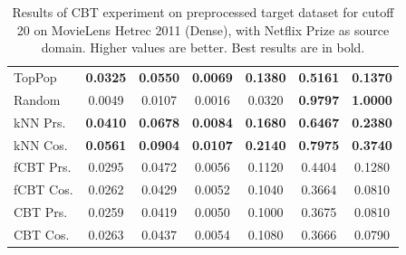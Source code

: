 \begin{table}[hbt]
\begin{tabulary}{\textwidth}{|L|CCCCCC|}
\hline
TopPop & \textbf{0.0325} & \textbf{0.0550} & \textbf{0.0069} & \textbf{0.1380} & \textbf{0.5161} & \textbf{0.1370} \\
Random & 0.0049 & 0.0107 & 0.0016 & 0.0320 & \textbf{0.9797} & \textbf{1.0000} \\
kNN Prs. & \textbf{0.0410} & \textbf{0.0678} & \textbf{0.0084} & \textbf{0.1680} & \textbf{0.6467} & \textbf{0.2380} \\
kNN Cos. & \textbf{0.0561} & \textbf{0.0904} & \textbf{0.0107} & \textbf{0.2140} & \textbf{0.7975} & \textbf{0.3740} \\
fCBT Prs. & 0.0295 & 0.0472 & 0.0056 & 0.1120 & 0.4404 & 0.1280 \\
fCBT Cos. & 0.0262 & 0.0429 & 0.0052 & 0.1040 & 0.3664 & 0.0810 \\
CBT Prs. & 0.0259 & 0.0419 & 0.0050 & 0.1000 & 0.3675 & 0.0810 \\
CBT Cos. & 0.0263 & 0.0437 & 0.0054 & 0.1080 & 0.3666 & 0.0790 \\
\hline
\end{tabulary}
\caption{Results of CBT experiment on preprocessed target dataset for cutoff 20 on MovieLens Hetrec 2011 (Dense), with Netflix Prize as source domain. Higher values are better. Best results are in bold.}
\end{table}

